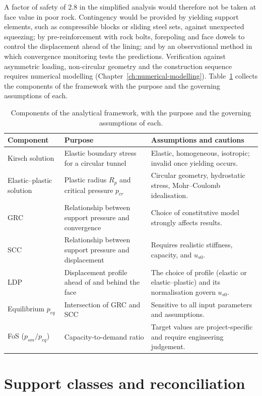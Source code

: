 A factor of safety of 2.8 in the simplified analysis would therefore
not be taken at face value in poor rock. Contingency would be provided
by yielding support elements, such as compressible blocks or sliding steel
sets, against unexpected squeezing; by pre-reinforcement with rock bolts,
forepoling and face dowels to control the displacement ahead of the lining;
and by an observational method in which convergence monitoring tests the
predictions. Verification against asymmetric loading, non-circular geometry
and the construction sequence requires numerical modelling
(Chapter~\ref{ch:numerical-modelling}). Table~\ref{tab:ccm-summary} collects
the components of the framework with the purpose and the governing
assumptions of each.

\begin{table}[htbp]
\caption{Components of the analytical framework, with the purpose and the governing assumptions of each.}
\label{tab:ccm-summary}
\centering
\small
\begin{tabularx}{\textwidth}{l X X}
\toprule
\textbf{Component} & \textbf{Purpose} & \textbf{Assumptions and cautions} \\
\midrule
Kirsch solution & Elastic boundary stress for a circular tunnel & Elastic, homogeneous, isotropic; invalid once yielding occurs. \\
Elastic--plastic solution & Plastic radius $R_p$ and critical pressure $p_{cr}$ & Circular geometry, hydrostatic stress, Mohr--Coulomb idealisation. \\
GRC & Relationship between support pressure and convergence & Choice of constitutive model strongly affects results. \\
SCC & Relationship between support pressure and displacement & Requires realistic stiffness, capacity, and $u_{s0}$. \\
LDP & Displacement profile ahead of and behind the face & The choice of profile (elastic or elastic--plastic) and its normalisation govern $u_{s0}$. \\
Equilibrium $p_{eq}$ & Intersection of GRC and SCC & Sensitive to all input parameters and assumptions. \\
FoS ($p_{sm}/p_{eq}$) & Capacity-to-demand ratio & Target values are project-specific and require engineering judgement. \\
\bottomrule
\end{tabularx}
\end{table}

\section{Support classes and reconciliation}
\label{sec:support-classes-and-reconciliation}

